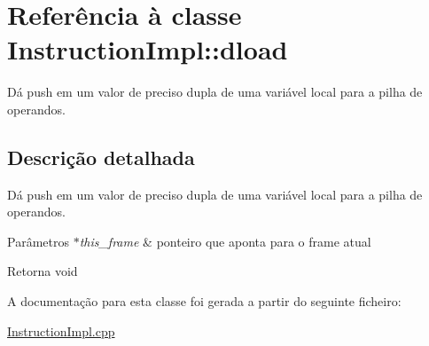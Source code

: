 \hypertarget{class_instruction_impl_1_1dload}{}\section{Referência à classe Instruction\+Impl\+:\+:dload}
\label{class_instruction_impl_1_1dload}


Dá push em um valor de preciso dupla de uma variável local para a pilha de operandos.  




\subsection{Descrição detalhada}
Dá push em um valor de preciso dupla de uma variável local para a pilha de operandos. 


\begin{DoxyParams}{Parâmetros}
{\em $\ast$this\+\_\+frame} & ponteiro que aponta para o frame atual \\
\hline
\end{DoxyParams}
\begin{DoxyReturn}{Retorna}
void 
\end{DoxyReturn}


A documentação para esta classe foi gerada a partir do seguinte ficheiro\+:\begin{DoxyCompactItemize}
\item 
\hyperlink{_instruction_impl_8cpp}{Instruction\+Impl.\+cpp}\end{DoxyCompactItemize}

